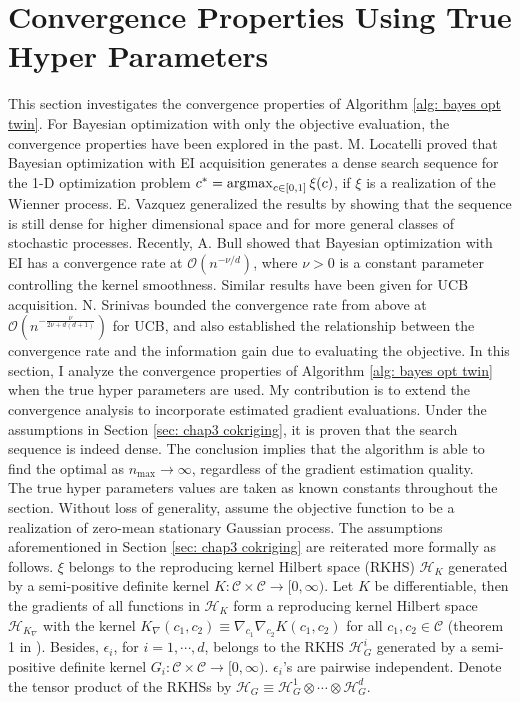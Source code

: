 \section{Convergence Properties Using True Hyper Parameters}
\label{sec: chap3 convergence}
This section investigates the convergence properties 
of Algorithm \ref{alg: bayes opt twin}.
For Bayesian optimization with only the 
objective evaluation, the convergence properties have been explored in the past.
M. Locatelli \cite{Locatelli} proved that Bayesian optimization with EI acquisition
generates a dense search sequence 
for the 1-D optimization problem 
$c^*=\operatorname*{\arg\!\max}_{c\in[0,1]} \xi(c)$, if $\xi$ is a realization of the Wienner process.
E. Vazquez \cite{convergen EI} generalized the results by showing that the sequence is still dense
for higher dimensional space and for more general classes of stochastic processes.
Recently, A. Bull \cite{converge Bull} showed that Bayesian optimization with EI
has a convergence rate at
$\mathcal{O}(n^{-\nu/d})$,
where $\nu>0$ is a constant parameter controlling the kernel smoothness. 
Similar results have been given for UCB acquisition. 
N. Srinivas \cite{GP bandit} bounded the convergence rate
from above at $\mathcal{O}(n^{- \frac{\nu}{2\nu+d(d+1)}})$ for UCB, and also established the 
relationship between the convergence rate and the information gain due to evaluating the objective.
In this section, I analyze the convergence properties of Algorithm \ref{alg: bayes opt twin} when 
the true hyper parameters are used. My contribution is to
extend the convergence analysis to incorporate estimated gradient evaluations.
Under the assumptions in Section \ref{sec: chap3 cokriging}, it is proven that
the search sequence is indeed dense.
The conclusion implies that the algorithm is able to find the optimal 
as $n_{\max}\rightarrow \infty$, regardless
of the gradient estimation quality.\\

The true hyper parameters values are taken as known constants throughout the section.
Without loss of generality, assume the objective function to be a realization of 
zero-mean stationary Gaussian process.
The assumptions aforementioned
in Section \ref{sec: chap3 cokriging} are reiterated more formally as follows.
$\xi$ 
belongs to the reproducing kernel Hilbert space (RKHS) $\mathcal{H}_K$ generated by a
semi-positive definite
kernel $K: \mathcal{C}\times \mathcal{C} \rightarrow [0,\infty)$.
Let $K$ be differentiable, then the gradients of all functions in $\mathcal{H}_K$
form a reproducing kernel Hilbert space $\mathcal{H}_{K_\nabla}$ with
the kernel $K_\nabla(c_1,c_2) \equiv \nabla_{c_1}\nabla_{c_2}K(c_1, c_2)$ 
for all $c_1,c_2\in \mathcal{C}$ (theorem 1 in \cite{derivative RKHS}).
Besides, $\epsilon_i$, for $i=1,\cdots, d$, belongs to the RKHS
$\mathcal{H}_{G}^i$ generated by a semi-positive definite
kernel $G_i: \mathcal{C}\times \mathcal{C} \rightarrow [0, \infty)$. $\epsilon_i$'s are pairwise
independent. 
Denote the tensor product of the RKHSs
by $\mathcal{H}_G \equiv \mathcal{H}_{G}^1 \otimes \cdots \otimes \mathcal{H}_G^d$.\\

